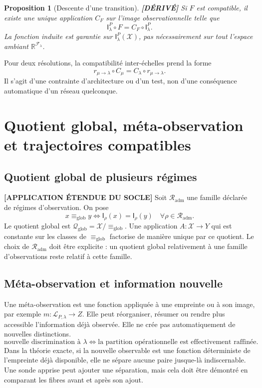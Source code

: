 \documentclass[11pt,a4paper]{article}
\newtheorem{proposition}[definition]{Proposition}
\theoremstyle{remark}
\newcommand{\R}{\mathbb R}
\newcommand{\X}{\mathcal X}
\newcommand{\Qspace}{\mathcal Q}
\newcommand{\F}{\mathcal F}
\newcommand{\Emp}{\mathsf I}
\begin{document}
\begin{proposition}[Descente d'une transition] \textbf{[DÉRIVÉ]}
Si $F$ est compatible, il existe une unique application $C_F$ sur l'image observationnelle telle que
\[
\boxed{\Emp_\lambda^P\circ F=C_F\circ\Emp_\lambda^P.}
\]
La fonction induite est garantie sur $\Emp_\lambda^P(\X)$, pas nécessairement sur tout l'espace ambiant $\R^{\F_\lambda}$.
\end{proposition}

Pour deux résolutions, la compatibilité inter-échelles prend la forme
\[
\boxed{r_{\mu\to\lambda}\circ C_\mu=C_\lambda\circ r_{\mu\to\lambda}.}
\]
Il s'agit d'une contrainte d'architecture ou d'un test, non d'une conséquence automatique d'un réseau quelconque.

\section{Quotient global, méta-observation et trajectoires compatibles}

\subsection{Quotient global de plusieurs régimes}
\textbf{[APPLICATION ÉTENDUE DU SOCLE]} Soit $\mathscr R_{\mathrm{adm}}$ une famille déclarée de régimes d'observation. On pose
\[
 x\equiv_{\mathrm{glob}}y\iff \Emp_\rho(x)=\Emp_\rho(y)\quad\forall\rho\in\mathscr R_{\mathrm{adm}}.
\]
Le quotient global est $\Qspace_{\mathrm{glob}}=\X/\!\equiv_{\mathrm{glob}}$. Une application $A:\X\to Y$ qui est constante sur les classes de $\equiv_{\mathrm{glob}}$ factorise de manière unique par ce quotient. Le choix de $\mathscr R_{\mathrm{adm}}$ doit être explicite : un quotient global relativement à une famille d'observations reste relatif à cette famille.

\subsection{Méta-observation et information nouvelle}
Une méta-observation est une fonction appliquée à une empreinte ou à son image, par exemple $m:\mathcal L_{P,\lambda}\to Z$. Elle peut réorganiser, résumer ou rendre plus accessible l'information déjà observée. Elle ne crée pas automatiquement de nouvelles distinctions.
\[
\boxed{\text{nouvelle discrimination à }\lambda\iff\text{la partition opérationnelle est effectivement raffinée}.}
\]
Dans la théorie exacte, si la nouvelle observable est une fonction déterministe de l'empreinte déjà disponible, elle ne sépare aucune paire jusque-là indiscernable. Une sonde apprise peut ajouter une séparation, mais cela doit être démontré en comparant les fibres avant et après son ajout.
\end{document}
